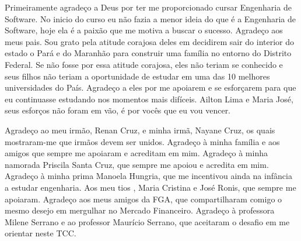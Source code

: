 \begin{agradecimentos}

Primeiramente agradeço a Deus por ter me proporcionado cursar Engenharia de Software. No inicio do curso eu não fazia a menor ideia do que é a Engenharia de Software, hoje ela é a paixão que me motiva a buscar o sucesso. Agradeço aos meus pais. Sou grato pela atitude corajosa deles em decidirem sair do interior do estado o Pará e do Maranhão para construir uma família no entorno do Distrito Federal. Se não fosse por essa atitude corajosa, eles não teriam se conhecido e seus filhos não teriam a oportunidade de estudar em uma das 10 melhores universidades do País. Agradeço a eles por me apoiarem e se esforçarem para que eu continuasse estudando nos momentos mais difíceis. Ailton Lima e Maria José, seus esforços não foram em vão, é por vocês que eu vou vencer.

Agradeço ao meu irmão, Renan Cruz, e minha irmã, Nayane Cruz, os quais mostraram-me que irmãos devem ser unidos. Agradeço à minha família e aos amigos que sempre me apoiaram e acreditam em mim. Agradeço à minha namorada Priscila Santa Cruz, que sempre me apoiou e acredita em mim. Agradeço à minha prima Manoela Hungria, que me incentivou ainda na infância a estudar engenharia. Aos meu tios , Maria Cristina e José Ronis, que sempre me apoiaram. Agradeço aos meus amigos da FGA, que compartilharam comigo o mesmo desejo em mergulhar no Mercado Financeiro. Agradeço à professora Milene Serrano e ao professor Maurício Serrano, que aceitaram o desafio em me orientar neste TCC.

\end{agradecimentos}
